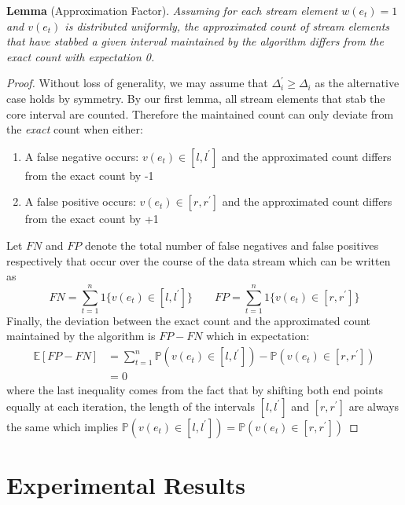 \textbf{Lemma} (Approximation Factor). \textit{Assuming for each stream element $w(e_t)=1$ and $v(e_t)$ is distributed uniformly, the approximated count of stream elements that have stabbed a given interval maintained by the algorithm differs from the exact count with expectation 0.} 
\begin{proof}
    Without loss of generality, we may assume that $\Delta_i^\prime \geq \Delta_i$ as the alternative case holds by symmetry. 
    By our first lemma, all stream elements that stab the core interval are counted. Therefore the maintained count can only deviate from the \textit{exact} count when either: 
    \begin{enumerate}
        \item A false negative occurs: $v(e_t) \in [l, l^\prime]$ and the approximated count differs from the exact count by -1
        \item A false positive occurs: $v(e_t) \in [r, r^\prime]$ and the approximated count differs from the exact count by +1
    \end{enumerate}
    Let $FN$ and $FP$ denote the total number of false negatives and false positives respectively that occur over the course of the data stream which can be written as
    $$FN = \sum_{t=1}^{n}1\{v(e_t) \in [l, l^\prime]\} \quad \quad FP = \sum_{t=1}^{n}1\{v(e_t) \in [r, r^\prime]\}$$
    Finally, the deviation between the exact count and the approximated count maintained by the algorithm is $FP - FN$ which in expectation:
    \begin{align*}
        \mathbb{E}[FP - FN] &= \sum_{t=1}^{n} \mathbb{P}(v(e_t) \in [l, l^\prime]) - \mathbb{P}(v(e_t) \in [r, r^\prime]) \\
        &= 0
    \end{align*}
    where the last inequality comes from the fact that by shifting both end points equally at each iteration, the length of the intervals $[l, l^\prime]$ and $[r, r^\prime]$ are always the same which implies $\mathbb{P}(v(e_t) \in [l, l^\prime]) = \mathbb{P}(v(e_t) \in [r, r^\prime])$
\end{proof} 

\newpage
\section{Experimental Results}